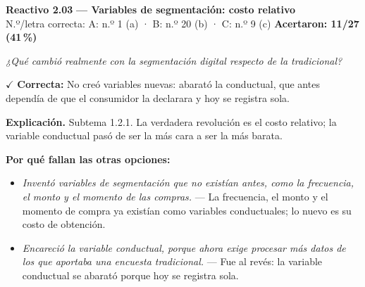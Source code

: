 \documentclass[10pt,letterpaper]{article}
\begin{document}
\begin{minipage}{\textwidth}
{\color{guinda}\textbf{Reactivo 2.03}} \textbf{— Variables de segmentación: costo relativo}\\[-1pt]
{\scriptsize N.º/letra correcta: A: n.º 1 (a) · B: n.º 20 (b) · C: n.º 9 (c) \hfill \textbf{Acertaron: 11/27 (41\,\%)}}

\textit{¿Qué cambió realmente con la segmentación digital respecto de la tradicional?}

\textcolor{verde}{$\checkmark$} \textbf{Correcta:} No creó variables nuevas: abarató la conductual, que antes dependía de que el consumidor la declarara y hoy se registra sola.

\textbf{Explicación.} Subtema 1.2.1. La verdadera revolución es el costo relativo; la variable conductual pasó de ser la más cara a ser la más barata.

\textbf{Por qué fallan las otras opciones:}
\begin{itemize}[itemsep=0pt,topsep=1pt,leftmargin=1.3em,parsep=0pt]
\item[\textcolor{rojo}{$\times$}] \textit{Inventó variables de segmentación que no existían antes, como la frecuencia, el monto y el momento de las compras.} --- La frecuencia, el monto y el momento de compra ya existían como variables conductuales; lo nuevo es su costo de obtención.
\item[\textcolor{rojo}{$\times$}] \textit{Encareció la variable conductual, porque ahora exige procesar más datos de los que aportaba una encuesta tradicional.} --- Fue al revés: la variable conductual se abarató porque hoy se registra sola.
\end{itemize}
\end{minipage}\par\vspace{5pt}{\color{gray!40}\hrule}\vspace{5pt}
\end{document}
